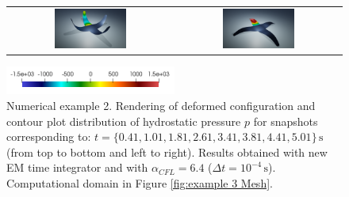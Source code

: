 \begin{figure}[hbtp]
\begin{tabular}{cc}
		\includegraphics[width=0.45\textwidth]{Figures/Example3/PressureNew/t06} &
		\includegraphics[width=0.45\textwidth]{Figures/Example3/PressureNew/t14}\\ 		
	\end{tabular}
	\includegraphics[width=0.5\textwidth]{Figures/Example3/PressureNew/ColorBarv2} 		
	\vspace{-2mm}
	\caption{Numerical example 2. Rendering of deformed configuration and contour plot distribution of hydrostatic pressure $p$ for snapshots corresponding to: $t=\{0.41,1.01,1.81,2.61,
		3.41,3.81,4.41,5.01
		\} \,\text{s}$ (from  top to bottom and left to right). Results obtained with new EM time integrator and with $\alpha_{CFL}=6.4$ ($\Delta t=10^{-4} \,\text{s}$). Computational domain in Figure \ref{fig:example 3 Mesh}.}
	\label{fig:example 3 pressure 1}
\end{figure}




